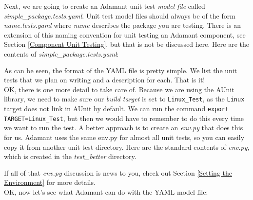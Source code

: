 Next, we are going to create an Adamant unit test \textit{model file} called \textit{simple\_package.tests.yaml}. Unit test model files should always be of the form \textit{name.tests.yaml} where \textit{name} describes the package you are testing. There is an extension of this naming convention for unit testing an Adamant component, see Section \ref{Component Unit Testing}, but that is not be discussed here. Here are the contents of \textit{simple\_package.tests.yaml}:


As can be seen, the format of the YAML file is pretty simple. We list the unit tests that we plan on writing and a description for each. That is it! \\

OK, there is one more detail to take care of. Because we are using the AUnit library, we need to make sure our \textit{build target} is set to \texttt{Linux\_Test}, as the \texttt{Linux} target does not link in AUnit by default. We can run the command \texttt{export TARGET=Linux\_Test}, but then we would have to remember to do this every time we want to run the test. A better approach is to create an \textit{env.py} that does this for us. Adamant uses the same env.py for almost all unit tests, so you can easily copy it from another unit test directory. Here are the standard contents of \textit{env.py}, which is created in the \textit{test\_better} directory.


If all of that \textit{env.py} discussion is news to you, check out Section \ref{Setting the Environment} for more details. \\

OK, now let's see what Adamant can do with the YAML model file:

